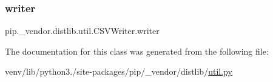 \subsubsection{\texorpdfstring{writer}{writer}}
{\footnotesize\ttfamily pip.\+\_\+vendor.\+distlib.\+util.\+C\+S\+V\+Writer.\+writer}



The documentation for this class was generated from the following file\+:\begin{DoxyCompactItemize}
\item 
venv/lib/python3./site-\/packages/pip/\+\_\+vendor/distlib/\hyperlink{pip_2__vendor_2distlib_2util_8py}{util.\+py}\end{DoxyCompactItemize}
